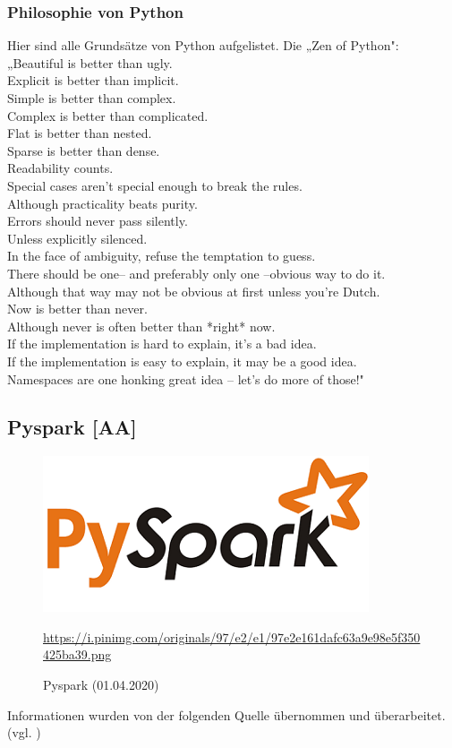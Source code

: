 \subsubsection{Philosophie von Python}
Hier sind alle Grundsätze von Python aufgelistet. Die „Zen of Python":\\
„Beautiful is better than ugly. \\
Explicit is better than implicit. \\
Simple is better than complex. \\
Complex is better than complicated. \\
Flat is better than nested. \\
Sparse is better than dense. \\
Readability counts. \\
Special cases aren't special enough to break the rules. \\
Although practicality beats purity. \\
Errors should never pass silently. \\
Unless explicitly silenced. \\
In the face of ambiguity, refuse the temptation to guess. \\
There should be one-- and preferably only one --obvious way to do it. \\
Although that way may not be obvious at first unless you're Dutch. \\
Now is better than never. \\
Although never is often better than *right* now. \\
If the implementation is hard to explain, it's a bad idea. \\
If the implementation is easy to explain, it may be a good idea. \\
Namespaces are one honking great idea -- let's do more of those!" \cite{python_pep_2020}
\subsection{Pyspark [AA]}
\begin{figure}[H]
\centering
  \includegraphics[scale=0.7]{images/pyspark.png}
  \caption[Pyspark (01.04.2020)]{Pyspark (01.04.2020)}
  \url{https://i.pinimg.com/originals/97/e2/e1/97e2e161dafc63a9e98e5f350425ba39.png}
  \label{fig:Pyspark}
\end{figure}
Informationen wurden von der folgenden Quelle übernommen und überarbeitet. (vgl. \cite{says_pyspark_2020})
